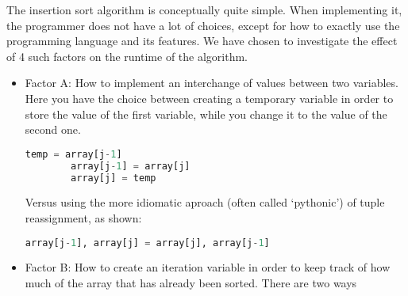 The insertion sort algorithm is conceptually quite simple. When implementing it, the programmer does not have a lot of choices, except for how to exactly use the programming language and its features. We have chosen to investigate the effect of 4 such factors on the runtime of the algorithm.    

\begin{itemize}
    \item Factor A: How to implement an interchange of values between two variables. Here you have the choice between creating a temporary variable in order to store the value of the first variable, while you change it to the value of the second one.
    \begin{lstlisting}[language=Python]
        temp = array[j-1]
        array[j-1] = array[j]
        array[j] = temp
    \end{lstlisting}
    Versus using the more idiomatic aproach (often called `pythonic') of tuple reassignment, as shown:
    \begin{lstlisting}[language=Python]
        array[j-1], array[j] = array[j], array[j-1]
    \end{lstlisting}
 
    \item Factor B: How to create an iteration variable in order to keep track of how much of the array that has already been sorted. There are two ways  
\end{itemize}
